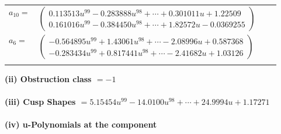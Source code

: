 \documentclass[1p]{elsarticle_modified}
\theoremstyle{definition}
\begin{document}
\begin{tabular}{m{7pt} m{180pt} m{7pt} m{180pt} }
\flushright $a_{10}=$&$\begin{pmatrix}0.113513 u^{99}-0.283888 u^{98}+\cdots+0.301011 u+1.22509\\0.161016 u^{99}-0.384450 u^{98}+\cdots+1.82572 u-0.0369255\end{pmatrix}$ \\
\flushright $a_{6}=$&$\begin{pmatrix}-0.564895 u^{99}+1.43061 u^{98}+\cdots-2.08996 u+0.587368\\-0.283434 u^{99}+0.817441 u^{98}+\cdots-2.41682 u+1.03126\end{pmatrix}$\\&\end{tabular}
\flushleft \textbf{(ii) Obstruction class $= -1$}\\~\\
\flushleft \textbf{(iii) Cusp Shapes $= 5.15454 u^{99}-14.0100 u^{98}+\cdots+24.9994 u+1.17271$}\\~\\
\newpage\renewcommand{\arraystretch}{1}
\flushleft \textbf{(iv) u-Polynomials at the component}\newline \\
\end{document}
